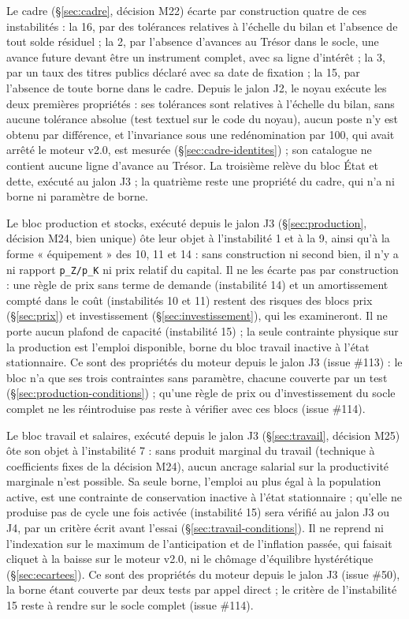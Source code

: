 \documentclass[11pt,a4paper]{article}
\begin{document}
Le cadre (\S\ref{sec:cadre}, décision M22) écarte par construction quatre de ces instabilités : la 16, par des tolérances relatives à l'échelle du bilan et l'absence de tout solde résiduel ; la 2, par l'absence d'avances au Trésor dans le socle, une avance future devant être un instrument complet, avec sa ligne d'intérêt ; la 3, par un taux des titres publics déclaré avec sa date de fixation ; la 15, par l'absence de toute borne dans le cadre. Depuis le jalon J2, le noyau exécute les deux premières propriétés : ses tolérances sont relatives à l'échelle du bilan, sans aucune tolérance absolue (test textuel sur le code du noyau), aucun poste n'y est obtenu par différence, et l'invariance sous une redénomination par 100, qui avait arrêté le moteur v2.0, est mesurée (\S\ref{sec:cadre-identites}) ; son catalogue ne contient aucune ligne d'avance au Trésor. La troisième relève du bloc État et dette, exécuté au jalon J3 ; la quatrième reste une propriété du cadre, qui n'a ni borne ni paramètre de borne.

Le bloc production et stocks, exécuté depuis le jalon J3 (\S\ref{sec:production}, décision M24, bien unique) ôte leur objet à l'instabilité 1 et à la 9, ainsi qu'à la forme « équipement » des 10, 11 et 14 : sans construction ni second bien, il n'y a ni rapport \texttt{p\_Z/p\_K} ni prix relatif du capital. Il ne les écarte pas par construction : une règle de prix sans terme de demande (instabilité 14) et un amortissement compté dans le coût (instabilités 10 et 11) restent des risques des blocs prix (\S\ref{sec:prix}) et investissement (\S\ref{sec:investissement}), qui les examineront. Il ne porte aucun plafond de capacité (instabilité 15) ; la seule contrainte physique sur la production est l'emploi disponible, borne du bloc travail inactive à l'état stationnaire. Ce sont des propriétés du moteur depuis le jalon J3 (issue \#113) : le bloc n'a que ses trois contraintes sans paramètre, chacune couverte par un test (\S\ref{sec:production-conditions}) ; qu'une règle de prix ou d'investissement du socle complet ne les réintroduise pas reste à vérifier avec ces blocs (issue \#114).

Le bloc travail et salaires, exécuté depuis le jalon J3 (\S\ref{sec:travail}, décision M25) ôte son objet à l'instabilité 7 : sans produit marginal du travail (technique à coefficients fixes de la décision M24), aucun ancrage salarial sur la productivité marginale n'est possible. Sa seule borne, l'emploi au plus égal à la population active, est une contrainte de conservation inactive à l'état stationnaire ; qu'elle ne produise pas de cycle une fois activée (instabilité 15) sera vérifié au jalon J3 ou J4, par un critère écrit avant l'essai (\S\ref{sec:travail-conditions}). Il ne reprend ni l'indexation sur le maximum de l'anticipation et de l'inflation passée, qui faisait cliquet à la baisse sur le moteur v2.0, ni le chômage d'équilibre hystérétique (\S\ref{sec:ecartees}). Ce sont des propriétés du moteur depuis le jalon J3 (issue \#50), la borne étant couverte par deux tests par appel direct ; le critère de l'instabilité 15 reste à rendre sur le socle complet (issue \#114).
\end{document}
